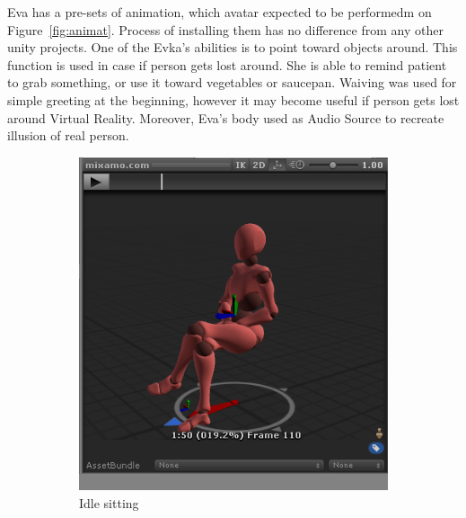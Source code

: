 \documentclass[18pt]{article}
\numberwithin{equation}{section} %
\numberwithin{figure}{section} %
\numberwithin{table}{section} %
\begin{document}
		Eva has a pre-sets of animation, which avatar expected to be performedm on Figure~\ref{fig:animat}. Process of installing them has no difference from any other unity projects. One of the Evka's abilities is to point toward objects around. This function is used in case if person gets lost around. She is able to remind patient to grab something, or use it toward vegetables or saucepan. Waiving was used for simple greeting at the beginning, however it may become useful if person gets lost around Virtual Reality. Moreover, Eva's body used as Audio Source to recreate illusion of real person. \\
		\begin{figure}[H]
			\centering
			\begin{subfigure}{0.2\textwidth}
				\centering
				\includegraphics[width=1\linewidth]{images/sit}
				\caption{Idle sitting}
			\end{subfigure}
			\begin{subfigure}{0.2\textwidth}
				\centering

\end{subfigure}
\end{figure}
\end{document}
